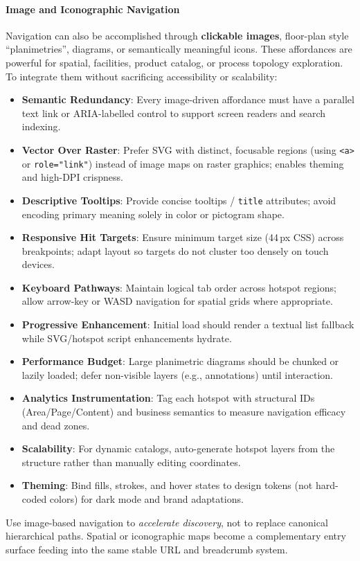 \paragraph{Image and Iconographic Navigation}\label{sec:image-nav}
Navigation can also be accomplished through \textbf{clickable images}, floor-plan style ``planimetries'', diagrams, or semantically meaningful icons. These affordances are powerful for spatial, facilities, product catalog, or process topology exploration. To integrate them without sacrificing accessibility or scalability:
\begin{itemize}
	\item \textbf{Semantic Redundancy}: Every image-driven affordance must have a parallel text link or ARIA-labelled control to support screen readers and search indexing.
	\item \textbf{Vector Over Raster}: Prefer SVG with distinct, focusable regions (using \texttt{<a>} or \texttt{role="link"}) instead of image maps on raster graphics; enables theming and high-DPI crispness.
	\item \textbf{Descriptive Tooltips}: Provide concise tooltips / \texttt{title} attributes; avoid encoding primary meaning solely in color or pictogram shape.
	\item \textbf{Responsive Hit Targets}: Ensure minimum target size (44\,px CSS) across breakpoints; adapt layout so targets do not cluster too densely on touch devices.
	\item \textbf{Keyboard Pathways}: Maintain logical tab order across hotspot regions; allow arrow-key or WASD navigation for spatial grids where appropriate.
	\item \textbf{Progressive Enhancement}: Initial load should render a textual list fallback while SVG/hotspot script enhancements hydrate.
	\item \textbf{Performance Budget}: Large planimetric diagrams should be chunked or lazily loaded; defer non-visible layers (e.g., annotations) until interaction.
	\item \textbf{Analytics Instrumentation}: Tag each hotspot with structural IDs (Area/Page/Content) and business semantics to measure navigation efficacy and dead zones.
	\item \textbf{Scalability}: For dynamic catalogs, auto-generate hotspot layers from the \wbdl{} structure rather than manually editing coordinates.
	\item \textbf{Theming}: Bind fills, strokes, and hover states to design tokens (not hard-coded colors) for dark mode and brand adaptations.
\end{itemize}
Use image-based navigation to \emph{accelerate discovery}, not to replace canonical hierarchical paths. Spatial or iconographic maps become a complementary entry surface feeding into the same stable URL and breadcrumb system.

